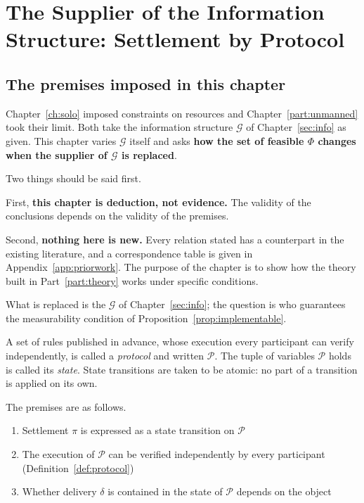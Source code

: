 \chapter{The Supplier of the Information Structure: Settlement by Protocol}
\label{ch:protocol}

\section{The premises imposed in this chapter}

Chapter~\ref{ch:solo} imposed constraints on resources and Chapter~\ref{part:unmanned} took
their limit. Both take the information structure $\mathcal{G}$ of Chapter~\ref{sec:info} as
given. This chapter varies $\mathcal{G}$ itself and asks
\textbf{how the set of feasible $\Phi$ changes when the supplier of $\mathcal{G}$ is
replaced}.

Two things should be said first.

First, \textbf{this chapter is deduction, not evidence.} The validity of the conclusions
depends on the validity of the premises.

Second, \textbf{nothing here is new.} Every relation stated has a counterpart in the existing
literature, and a correspondence table is given in Appendix~\ref{app:priorwork}. The purpose
of the chapter is to show how the theory built in Part~\ref{part:theory} works under
specific conditions.

What is replaced is the $\mathcal{G}$ of Chapter~\ref{sec:info}; the question is who
guarantees the measurability condition of Proposition~\ref{prop:implementable}.

\begin{definition}[Protocol]
\label{def:protocol}
A set of rules published in advance, whose execution every participant can verify
independently, is called a \emph{protocol} and written $\mathcal{P}$. The tuple of variables
$\mathcal{P}$ holds is called its \emph{state}. State transitions are taken to be atomic:
no part of a transition is applied on its own.
\end{definition}

The premises are as follows.

\begin{enumerate}[label=(\arabic*)]
\item Settlement $\pi$ is expressed as a state transition on $\mathcal{P}$
\item The execution of $\mathcal{P}$ can be verified independently by every participant (Definition~\ref{def:protocol})
\item Whether delivery $\delta$ is contained in the state of $\mathcal{P}$ depends on the object
\end{enumerate}

